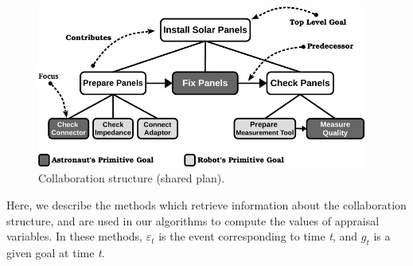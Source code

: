 \documentclass[12pt]{report}
\begin{document}
\begin{figure}[t]
  \centering
  \includegraphics[width=0.97\textwidth]{figure/collaborationStructure-small-croped.pdf}
  \caption{{\fontsize{10}{10}\selectfont Collaboration structure (shared
  plan).}}
  \label{fig:cs}
  \vspace*{-5mm}
\end{figure}

Here, we describe the methods which retrieve information about the collaboration
structure, and are used in our algorithms to compute the values of appraisal
variables. In these methods, $\varepsilon_t$ is the event corresponding to time
\textit{t}, and $g_t$ is a given goal at time \textit{t}.
\end{document}
